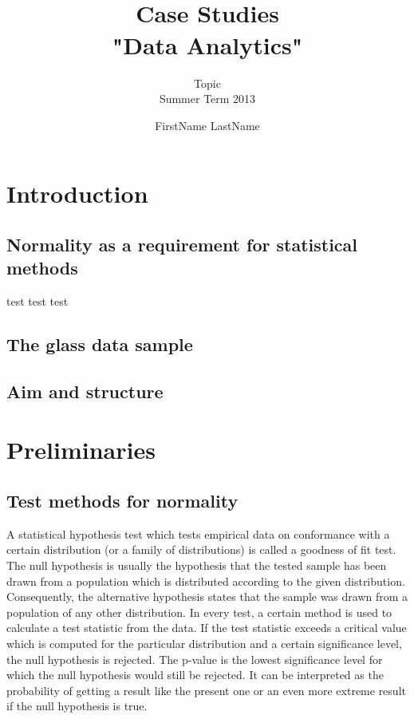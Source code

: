\documentclass[a4paper, 12pt, titlepage, headsepline, listof = totoc, bibliography = totoc, numbers = noenddot]{scrartcl}
\title{\hrulefill \\ \vspace*{1cm} Case Studies\\\vspace*{0.5cm}
 "Data Analytics" \\ \vspace*{1cm}\hrulefill\vspace*{1.5cm}}
\subtitle{Topic\\\vspace*{1.5cm} Summer Term 2013\vspace*{1.5cm}}
\author{FirstName LastName}
\begin{document}

\thispagestyle{empty}
\maketitle


\thispagestyle{empty}
\tableofcontents


\newpage
\setcounter{page}{1}
\section{Introduction}

\subsection{Normality as a requirement for statistical methods}

test test test

\subsection{The glass data sample}

\subsection{Aim and structure}

\newpage
\section{Preliminaries}

\subsection{Test methods for normality}\label{sec:methods}

A statistical hypothesis test which tests empirical data on conformance with a certain distribution (or a family of distributions) is called a goodness of fit test. The null hypothesis is usually the hypothesis that the tested sample has been drawn from a population which is distributed according to the given distribution. Consequently, the alternative hypothesis states that the sample was drawn from a population of any other distribution. In every test, a certain method is used to calculate a test statistic from the data. If the test statistic exceeds a critical value which is computed for the particular distribution and a certain significance level, the null hypothesis is rejected. The p-value is the lowest significance level for which the null hypothesis would still be rejected. It can be interpreted as the probability of getting a result like the present one or an even more extreme result if the null hypothesis is true.
\end{document}
